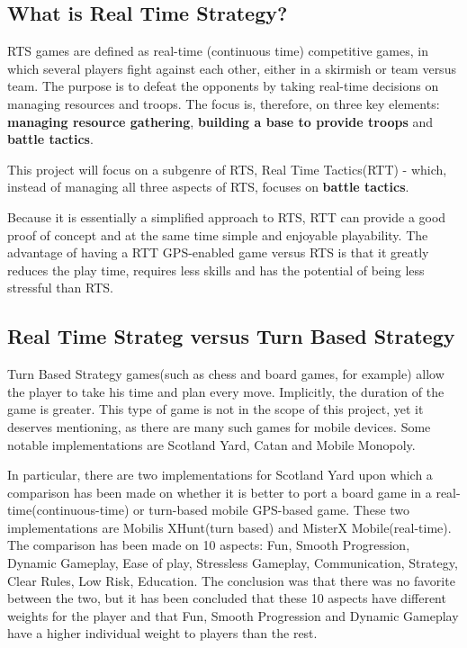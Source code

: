 \documentclass{article}
\begin{document}
\subsection{What is Real Time Strategy?}

RTS games are defined as real-time (continuous time) competitive games, in which
several players fight against each other, either in a skirmish or team versus
team. The purpose is to defeat the opponents by taking real-time decisions on
managing resources and troops. The focus is, therefore, on three key elements:
\textbf{managing resource gathering}, \textbf{building a base to provide troops}
and \textbf{battle tactics}.\newline

This project will focus on a subgenre of RTS, Real Time Tactics(RTT) - which,
instead of managing all three aspects of RTS, focuses on \textbf{battle
tactics}.\newline

Because it is essentially a simplified approach to RTS, RTT can provide a good
proof of concept and at the same time simple and enjoyable playability. The
advantage of having a RTT GPS-enabled game versus RTS is that it greatly reduces
the play time, requires less skills and has the potential of being less
stressful than RTS.\newline

\subsection{Real Time Strateg versus Turn Based Strategy}

Turn Based Strategy games(such as chess and board games, for example) allow the
player to take his time and plan every move. Implicitly, the duration of the
game is greater. This type of game is not in the scope of this project, yet it
deserves mentioning, as there are many such games for mobile devices. Some
notable implementations are Scotland Yard, Catan and Mobile Monopoly.\newline

In particular, there are two implementations for Scotland Yard upon which a
comparison has been made on whether it is better to port a board game in a
real-time(continuous-time) or turn-based mobile GPS-based game. These two
implementations are Mobilis XHunt(turn based) and MisterX Mobile(real-time).
The comparison has been made on 10 aspects: Fun, Smooth Progression, Dynamic
Gameplay, Ease of play, Stressless Gameplay, Communication, Strategy, Clear
Rules, Low Risk, Education. The conclusion was that there was no favorite
between the two, but it has been concluded that these 10 aspects have different
weights for the player and that Fun, Smooth Progression and Dynamic Gameplay
have a higher individual weight to players than the rest.\newline
\end{document}
